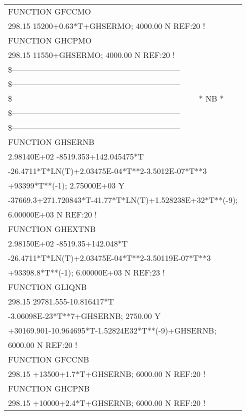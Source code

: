 \begin{longtable}[H]{ l l l }
	FUNCTION GFCCMO & & \\
	\multicolumn{3}{l}{298.15 15200+0.63*T+GHSERMO; 4000.00 N REF:20 !}\\
	FUNCTION GHCPMO & & \\
	\multicolumn{3}{l}{298.15 11550+GHSERMO; 4000.00 N REF:20 !}\\
	\multicolumn{3}{l}{\$---------------------------------------------------------------}\\
	\multicolumn{3}{l}{\$---------------------------------------------------------------}\\
	\$ & \multicolumn{2}{c}{* NB *}\\
	\multicolumn{3}{l}{\$---------------------------------------------------------------}\\
	\multicolumn{3}{l}{\$---------------------------------------------------------------}\\
	FUNCTION GHSERNB & & \\
	\multicolumn{3}{l}{2.98140E+02  -8519.353+142.045475*T}\\
	\multicolumn{3}{l}{-26.4711*T*LN(T)+2.03475E-04*T**2-3.5012E-07*T**3}\\
	\multicolumn{3}{l}{+93399*T**(-1);  2.75000E+03  Y}\\
	\multicolumn{3}{l}{-37669.3+271.720843*T-41.77*T*LN(T)+1.528238E+32*T**(-9);}\\
	\multicolumn{3}{l}{6.00000E+03 N  REF:20 !}\\
	FUNCTION GHEXTNB & & \\
	\multicolumn{3}{l}{2.98150E+02  -8519.35+142.048*T}\\
	\multicolumn{3}{l}{-26.4711*T*LN(T)+2.03475E-04*T**2-3.50119E-07*T**3}\\
	\multicolumn{3}{l}{+93398.8*T**(-1);   6.00000E+03   N REF:23 !}\\
	FUNCTION GLIQNB & & \\
	\multicolumn{3}{l}{298.15   29781.555-10.816417*T}\\
	\multicolumn{3}{l}{-3.06098E-23*T**7+GHSERNB; 2750.00 Y}\\
	\multicolumn{3}{l}{+30169.901-10.964695*T-1.52824E32*T**(-9)+GHSERNB;}\\
	\multicolumn{3}{l}{6000.00 N REF:20 !}\\
	FUNCTION GFCCNB & & \\
	\multicolumn{3}{l}{298.15     +13500+1.7*T+GHSERNB;
6000.00 N REF:20 !}\\
	FUNCTION GHCPNB & & \\
	\multicolumn{3}{l}{298.15   +10000+2.4*T+GHSERNB; 6000.00 N REF:20 !}\\

\end{longtable}
